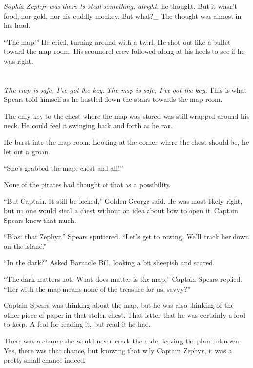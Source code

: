\documentclass[12pt]{extbook}
\begin{document}
  \emph{Sophia Zephyr was there to steal something, alright}, he thought.
  But it wasn't food, nor gold, nor his cuddly monkey. But what?\_ The
  thought was almost in his head.
  
  \enquote{The map!} He cried, turning around with a twirl. He shot out
  like a bullet toward the map room. His scoundrel crew followed along at
  his heels to see if he was right.
  
  \section{}\label{section-9}
  
  \emph{The map is safe, I've got the key. The map is safe, I've got the
  key.} This is what Spears told himself as he hustled down the stairs
  towards the map room.
  
  The only key to the chest where the map was stored was still wrapped
  around his neck. He could feel it swinging back and forth as he ran.
  
  He burst into the map room. Looking at the corner where the chest should
  be, he let out a groan.
  
  \enquote{She's grabbed the map, chest and all!}
  
  None of the pirates had thought of that as a possibility.
  
  \enquote{But Captain. It still be locked,} Golden George said. He was
  most likely right, but no one would steal a chest without an idea about
  how to open it. Captain Spears knew that much.
  
  \enquote{Blast that Zephyr,} Spears sputtered. \enquote{Let's get to
  rowing. We'll track her down on the island.}
  
  \enquote{In the dark?} Asked Barnacle Bill, looking a bit sheepish and
  scared.
  
  \enquote{The dark matters not. What does matter is the map,} Captain
  Spears replied. \enquote{Her with the map means none of the treasure for
  us, savvy?}
  
  Captain Spears was thinking about the map, but he was also thinking of
  the other piece of paper in that stolen chest. That letter that he was
  certainly a fool to keep. A fool for reading it, but read it he had.
  
  There was a chance she would never crack the code, leaving the plan
  unknown. Yes, there was that chance, but knowing that wily Captain
  Zephyr, it was a pretty small chance indeed.
  
\end{document}
